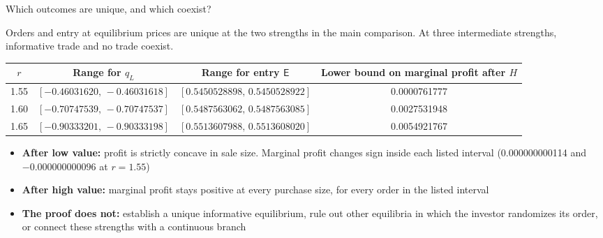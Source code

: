 \documentclass[10pt,aspectratio=169]{beamer}
\newcommand{\NavGap}{\par\vspace{0.45cm}}%
\let\AdapterBackButton\BackButton
\renewcommand{\BackButton}[1]{\NavGap\AdapterBackButton{#1}}%
\begin{document}
\begin{frame}[label=A21]{Which outcomes are unique, and which coexist?}
\hypertarget{app:cert}{}
\vspace{5pt}
{\small Orders and entry at equilibrium prices are unique at the two strengths in the main comparison. At three intermediate strengths, informative trade and no trade coexist.\par}
\vspace{4pt}
\begin{center}\footnotesize
\begin{tabular}{@{}cccc@{}}
\toprule
$r$ & Range for $q_L$ & Range for entry $\mathsf E$ & \shortstack{Lower bound on\\marginal profit after $H$}\\
\midrule
1.55 %
 & $[-0.46031620,\,-0.46031618]$ %
 & $[0.5450528898,\,0.5450528922]$ %
 & 0.0000761777\\ %
1.60 %
 & $[-0.70747539,\,-0.70747537]$ %
 & $[0.5487563062,\,0.5487563085]$ %
 & 0.0027531948\\ %
1.65 %
 & $[-0.90333201,\,-0.90333198]$ %
 & $[0.5513607988,\,0.5513608020]$ %
 & 0.0054921767\\ %
\bottomrule
\end{tabular}
\end{center}
\vspace{-4pt}
{\small
\begin{itemize}\setlength{\itemsep}{2pt}
\item \textbf{After low value:} profit is strictly concave in sale size. Marginal profit changes sign inside each listed interval (0.000000000114 %
and $-0.000000000096$ at $r=1.55$) %
\item \textbf{After high value:} marginal profit stays positive at every purchase size, for every order in the listed interval
\item \textbf{The proof does not:} establish a unique informative equilibrium, rule out other equilibria in which the investor randomizes its order, or connect these strengths with a continuous branch
\end{itemize}}
\end{frame}
\end{document}
